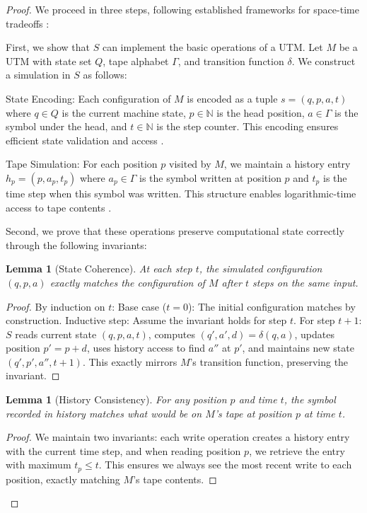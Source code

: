 \documentclass[12pt]{article}
\newtheorem{lemma}[theorem]{Lemma}
\begin{document}
\begin{proof}
We proceed in three steps, following established frameworks for space-time tradeoffs \cite{swamy1983space,hu2014computational}:

First, we show that $S$ can implement the basic operations of a UTM. Let $M$ be a UTM with state set $Q$, tape alphabet $\Gamma$, and transition function $\delta$. We construct a simulation in $S$ as follows:

State Encoding: Each configuration of $M$ is encoded as a tuple $s = (q, p, a, t)$ where $q \in Q$ is the current machine state, $p \in \mathbb{N}$ is the head position, $a \in \Gamma$ is the symbol under the head, and $t \in \mathbb{N}$ is the step counter. This encoding ensures efficient state validation and access \cite{boyle2024memory,hu2014computational}.

Tape Simulation: For each position $p$ visited by $M$, we maintain a history entry $h_p = (p, a_p, t_p)$ where $a_p \in \Gamma$ is the symbol written at position $p$ and $t_p$ is the time step when this symbol was written. This structure enables logarithmic-time access to tape contents \cite{swamy1983space,liskiewicz1994complexity}.

Second, we prove that these operations preserve computational state correctly through the following invariants:

\begin{lemma}[State Coherence]
At each step $t$, the simulated configuration $(q, p, a)$ exactly matches the configuration of $M$ after $t$ steps on the same input.
\end{lemma}

\begin{proof}
By induction on $t$:
Base case ($t=0$): The initial configuration matches by construction.
Inductive step: Assume the invariant holds for step $t$. For step $t+1$: $S$ reads current state $(q, p, a, t)$, computes $(q', a', d) = \delta(q, a)$, updates position $p' = p + d$, uses history access to find $a''$ at $p'$, and maintains new state $(q', p', a'', t+1)$. This exactly mirrors $M$'s transition function, preserving the invariant.
\end{proof}

\begin{lemma}[History Consistency]
For any position $p$ and time $t$, the symbol recorded in history matches what would be on $M$'s tape at position $p$ at time $t$.
\end{lemma}

\begin{proof}
We maintain two invariants: each write operation creates a history entry with the current time step, and when reading position $p$, we retrieve the entry with maximum $t_p \leq t$. This ensures we always see the most recent write to each position, exactly matching $M$'s tape contents.
\end{proof}


\end{proof}
\end{document}
